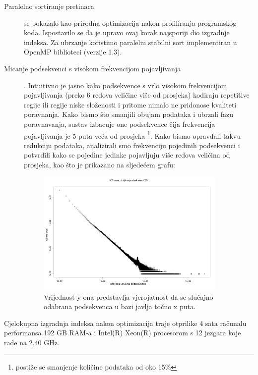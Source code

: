 \documentclass[times, utf8, diplomski]{fer}
\begin{document}
\begin{description}
\item [Paralelno sortiranje pretinaca] se pokazalo kao prirodna optimizacija nakon profiliranja programskog koda.
Ispostavilo se da je upravo ovaj korak najsporiji dio izgradnje indeksa. Za ubrzanje koristimo paralelni stabilni
sort implementiran u OpenMP biblioteci (verzije 1.3).
\item [Micanje podsekvenci s visokom frekvencijom pojavljivanja]. Intuitivno je jasno kako podsekvence s vrlo visokom frekvencijom pojavljivanja (preko 6 redova veličine više od prosjeka) kodiraju repetitive regije ili 
regije niske složenosti i pritome nimalo ne pridonose kvaliteti poravnanja. Kako bismo što smanjili obujam podataka
i ubrzali fazu poravnavanja, sustav izbacuje one podsekvence čija frekvencija pojavljivanja je 5 puta veća od
prosjeka \footnote{postiže se smanjenje količine podataka od oko 15\%}. Kako bismo opravdali takvu redukciju
podataka, analizirali smo frekvenciju pojedinih podsekvenci i potvrdili kako se pojedine jedinke pojavljuju više
redova veličina od prosjeka, kao što je prikazano na sljedećem grafu:

\begin{figure}[!ht]
\begin{center}
	\includegraphics[width=0.9\textwidth]{../img/kmers_20.png}
	\caption{Vrijednost y-ona predstavlja vjerojatnost da se slučajno odabrana podsekvenca u bazi javlja točno x puta.}
\end{center}
\end{figure}

\end{description}

Cjelokupna izgradnja indeksa nakon optimizacija traje otprilike 4 sata računalu performansa 192 GB RAM-a i Intel(R) Xeon(R) procesorom s 12 jezgara koje rade na 2.40 GHz.
\end{document}
